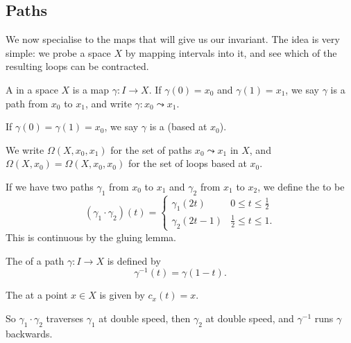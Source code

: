 \subsection{Paths}

We now specialise to the maps that will give us our invariant. The idea is very simple:
we probe a space $X$ by mapping intervals into it, and see which of the resulting loops
can be contracted.

\begin{definition}[Path]
	A  in a space $X$ is a map $\gamma: I \rightarrow X$.
	If $\gamma(0) = x_0$ and $\gamma(1) = x_1$, we say $\gamma$ is a path from $x_0$ to $x_1$, and write $\gamma: x_0 \leadsto x_1$.

	If $\gamma(0) = \gamma(1) = x_0$, we say $\gamma$ is a  (based at $x_0$).
\end{definition}

We write $\Omega(X, x_0, x_1)$ for the set of paths $x_0 \leadsto x_1$ in $X$, and
$\Omega(X, x_0) = \Omega(X, x_0, x_0)$ for the set of loops based at $x_0$.

\begin{definition}
	If we have two paths $\gamma_1$ from $x_0$ to $x_1$ and $\gamma_2$ from $x_1$ to $x_2$, we define the  to be
	$$
	(\gamma_1 \cdot \gamma_2)(t) = \begin{cases}
		\gamma_1(2t) & 0 \leq t \leq \frac{1}{2}\\
		\gamma_2(2t - 1) & \frac{1}{2} \leq t \leq 1.
	\end{cases}
	$$
	This is continuous by the gluing lemma.

	The  of a path $\gamma: I \rightarrow X$ is defined by
	$$
	\gamma^{-1}(t) = \gamma(1 -t).
	$$

	The  at a point $x \in X$ is given by $c_x(t) = x$.
\end{definition}

So $\gamma_1 \cdot \gamma_2$ traverses $\gamma_1$ at double speed, then $\gamma_2$ at
double speed, and $\gamma^{-1}$ runs $\gamma$ backwards.

\begin{center}
\end{center}

